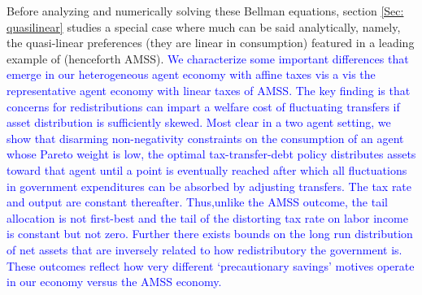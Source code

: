 \documentclass[thmsb,11pt]{article}
\begin{document}
Before analyzing and numerically solving  these Bellman equations, section \ref{Sec: quasilinear}
studies a special case where much can be said analytically, namely,
the  quasi-linear preferences  (they are linear in consumption) featured in a leading example of \citet{Aiyagari2002} (henceforth AMSS).  \textcolor{blue}{We characterize some important differences that emerge in our heterogeneous agent economy with affine taxes vis a vis the representative agent economy with
linear taxes of AMSS. The key finding is that concerns for redistributions can impart a welfare cost of fluctuating transfers if asset distribution is sufficiently skewed. Most clear in a two agent setting, we show that disarming non-negativity constraints on the consumption of an agent whose Pareto weight is low, the optimal tax-transfer-debt policy distributes assets toward that agent until a point is eventually reached after which all fluctuations in government expenditures can be absorbed by adjusting transfers. The tax rate and output are constant thereafter. Thus,unlike the AMSS outcome,
the tail allocation is not first-best and the tail of the distorting tax rate on labor income is constant but not zero. Further there exists bounds on the long run distribution of net assets that are inversely related to how redistributory the government is. These outcomes reflect how very different `precautionary savings' motives operate in our economy versus the AMSS economy.}

\end{document}
